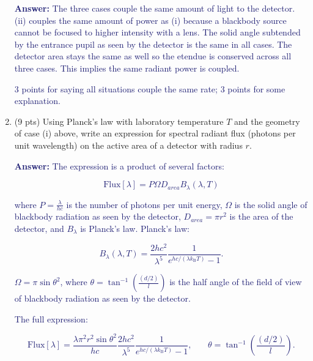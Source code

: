 \documentclass[11pt]{caltech_thesis} %
\begin{document}
\begin{enumerate}
  \textcolor{midnightblue}{ \textbf{Answer:} }
  \textcolor{midnightblue}{ The three cases couple the same amount of light to the detector. (ii) couples the same amount of power as (i) because a blackbody source cannot be focused to higher intensity with a lens. The solid angle subtended by the entrance pupil as seen by the detector is the same in all cases. The detector area stays the same as well so the etendue is conserved across all three cases. This implies the same radiant power is coupled. }

  \textcolor{midnightblue}{ 3 points for saying all situations couple the same rate; 3 points for some explanation. }
\item
  (9 pts) Using Planck's law with laboratory temperature $T$ and the geometry of case (i) above, write an expression for spectral radiant flux (photons per unit wavelength) on the active area of a detector with radius $r$.

  \textcolor{midnightblue}{ \textbf{Answer:} }
  \textcolor{midnightblue}{The expression is a product of several factors:}

  \textcolor{midnightblue}{

  $$\text{Flux}[\lambda] = P \Omega D_{area} B_{\lambda}(\lambda, T)$$

  }

  \textcolor{midnightblue}{ where $P = \frac{\lambda}{hc}$ is the number of photons per unit energy, $\Omega$ is the solid angle of blackbody radiation as seen by the detector, $D_{area} = \pi r^2$ is the area of the detector, and $B_{\lambda}$ is Planck's law. }
  \textcolor{midnightblue}{Planck's law:}

  \textcolor{midnightblue}{

  $$B_{\lambda}(\lambda, T)=\frac{2 h c^{2}}{\lambda^{5}} \frac{1}{e^{h c /\left(\lambda k_{\mathrm{B}} T\right)}-1}.$$

  }

  \textcolor{midnightblue}{ $\Omega = \pi \sin{\theta^2}$, where $\theta = \tan^{-1}(\frac{(d/2)}{l})$ is the half angle of the field of view of blackbody radiation as seen by the detector. }

  \textcolor{midnightblue}{The full expression: }

  \textcolor{midnightblue}{

  $$\text{Flux}[\lambda] = \frac{\lambda \pi^2 r^2 \sin{\theta^2}}{hc} \frac{2 h c^{2}}{\lambda^{5}} \frac{1}{e^{h c /\left(\lambda k_{\mathrm{B}} T\right)}-1}, \,\,\,\,\,\,\,\,\,\,\,\theta = \tan^{-1}(\frac{(d/2)}{l}).$$

}
\end{enumerate}
\end{document}
